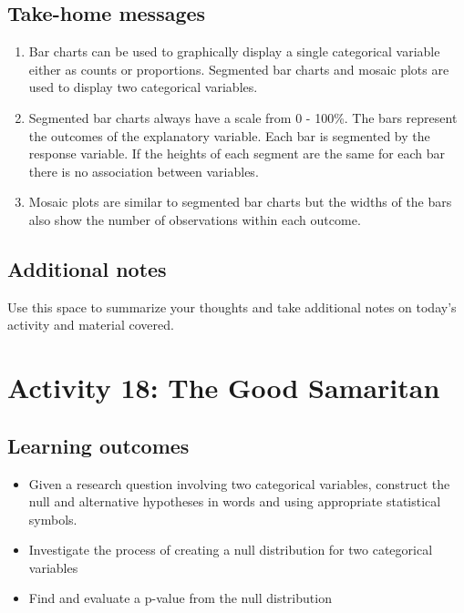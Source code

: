 \documentclass[
]{report}
\begin{document}
\vspace{1in}

\subsection{Take-home messages}\label{take-home-messages-16}

\begin{enumerate}
\def\labelenumi{\arabic{enumi}.}
\item
  Bar charts can be used to graphically display a single categorical variable either as counts or proportions. Segmented bar charts and mosaic plots are used to display two categorical variables.
\item
  Segmented bar charts always have a scale from 0 - 100\%. The bars represent the outcomes of the explanatory variable. Each bar is segmented by the response variable. If the heights of each segment are the same for each bar there is no association between variables.
\item
  Mosaic plots are similar to segmented bar charts but the widths of the bars also show the number of observations within each outcome.
\end{enumerate}

\subsection{Additional notes}\label{additional-notes-16}

Use this space to summarize your thoughts and take additional notes on today's activity and material covered.

\newpage

\section{Activity 18: The Good Samaritan}\label{activity-18-the-good-samaritan}


\subsection{Learning outcomes}\label{learning-outcomes-19}

\begin{itemize}
\item
  Given a research question involving two categorical variables, construct the null and alternative hypotheses
  in words and using appropriate statistical symbols.
\item
  Investigate the process of creating a null distribution for two categorical variables
\item
  Find and evaluate a p-value from the null distribution
\end{itemize}
\end{document}
